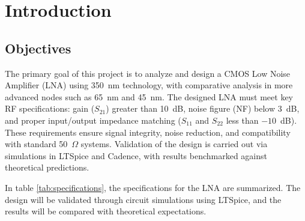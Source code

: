 \section{Introduction}

\subsection{Objectives}

The primary goal of this project is to analyze and design a CMOS Low Noise Amplifier (LNA) using 350~nm technology, with comparative analysis in more advanced nodes such as 65~nm and 45~nm. The designed LNA must meet key RF specifications: gain ($S_{21}$) greater than 10~dB, noise figure (NF) below 3~dB, and proper input/output impedance matching ($S_{11}$ and $S_{22}$ less than $-10$~dB). These requirements ensure signal integrity, noise reduction, and compatibility with standard 50~$\Omega$ systems. Validation of the design is carried out via simulations in LTSpice and Cadence, with results benchmarked against theoretical predictions.


In table \ref{tab:specifications}, the specifications for the LNA are summarized. The design will be validated through circuit simulations using LTSpice, and the results will be compared with theoretical expectations.


